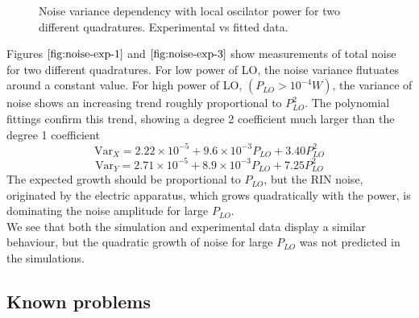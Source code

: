 \begin{bibunit}[plain]
\begin{figure}[H]
	\caption{Noise variance dependency with local oscilator power for two different quadratures. Experimental vs fitted data.}
\end{figure}
%
Figures $\ref{fig:noise-exp-1}$ and $\ref{fig:noise-exp-3}$ show measurements of total noise for two different quadratures. For low power of LO, the noise variance flutuates around a constant value. For high power of LO, $(P_{LO}>10^{-4}W)$, the variance of noise shows an increasing trend roughly proportional to $P_{LO}^2$. The polynomial fittings confirm this trend, showing a degree 2 coefficient much larger than the degree 1 coefficient
%
\begin{equation}
\textrm{Var}_X = 2.22 \!\! \times \!\! 10^{-5} + 9.6 \!\! \times \!\! 10^{-3} P_{LO} + 3.40 P_{LO}^2
\end{equation}
\begin{equation}
\textrm{Var}_Y = 2.71 \!\! \times \!\! 10^{-5} + 8.9 \!\! \times \!\! 10^{-3} P_{LO} + 7.25 P_{LO}^2
\end{equation}
%
The expected growth should be proportional to $P_{LO}$, but the RIN noise, originated by the electric apparatus, which grows quadratically with the power, is dominating the noise amplitude for large $P_{LO}$.\\
We see that both the simulation and experimental data display a similar behaviour, but the quadratic growth of noise for large $P_{LO}$ was not predicted in the simulations.\\
%
%
\subsection{Known problems}
%
%
\end{bibunit}
%

